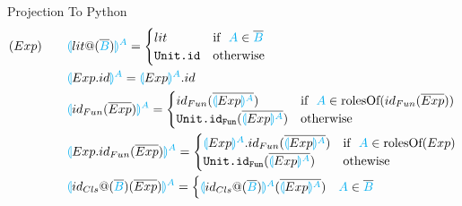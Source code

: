 \documentclass[11pt]{jarticle}
\begin{document}
Projection To Python
\begin{alignat*}{2}
  &(Exp)~~~ &&\color{cyan}\llparenthesis \color{black}lit@(\overline{\color{cyan}B}\color{black}) \color{cyan}\rrparenthesis^A \color{black}=
  \begin{cases}
    lit & \text{if}~~ \color{cyan}A \color{black}\in \overline{\color{cyan}B}\\
    \texttt{Unit.id} &\text{otherwise}
  \end{cases}\\
  &&&\color{cyan}\llparenthesis \color{black}Exp.id \color{cyan}\rrparenthesis^A \color{black}= \color{cyan}\llparenthesis \color{black}Exp \color{cyan}\rrparenthesis^A \color{black}.id\\
  &&&\color{cyan}\llparenthesis \color{black}id_{Fun}(\overline{Exp}) \color{cyan}\rrparenthesis^A \color{black}=
  \begin{cases}
    id_{Fun}(\overline{\color{cyan}\llparenthesis \color{black}Exp \color{cyan}\rrparenthesis^A}) &\color{black}\text{if}~~ \color{cyan}A \color{black} \in \text{rolesOf} (id_{Fun}(\overline{Exp}))\\
    \texttt{Unit.id}_\texttt{Fun}(\overline{\color{cyan}\llparenthesis \color{black}Exp \color{cyan}\rrparenthesis^A}) &\color{black} \text{otherwise}
  \end{cases}\\
  &&&\color{cyan}\llparenthesis \color{black}Exp.id_{Fun}(\overline{Exp}) \color{cyan}\rrparenthesis^A \color{black}=
  \begin{cases}
    \color{cyan}\llparenthesis \color{black}Exp \color{cyan}\rrparenthesis^A \color{black}.id_{Fun}(\overline{\color{cyan}\llparenthesis \color{black}Exp \color{cyan}\rrparenthesis^A}) &\text{if}~~ \color{cyan}A \color{black} \in \text{rolesOf}(Exp)\\
    \texttt{Unit.id}_\texttt{Fun}(\overline{\color{cyan}\llparenthesis \color{black}Exp \color{cyan}\rrparenthesis^A}) &\color{black} \text{othewise}
  \end{cases}\\
  &&&\color{cyan}\llparenthesis \color{black}id_{Cls}@(\overline{\color{cyan}B}\color{black})(\overline{Exp}) \color{cyan}\rrparenthesis^A \color{black}=
  \begin{cases}
    \color{cyan}\llparenthesis \color{black}id_{Cls}@(\overline{\color{cyan}B}) \color{cyan}\rrparenthesis^A \color{black}(\overline{\color{cyan}\llparenthesis \color{black}Exp \color{cyan}\rrparenthesis^A}\color{black}) & \color{cyan}A \color{black} \in \overline{\color{cyan}B}\\

\end{cases}
\end{alignat*}
\end{document}
